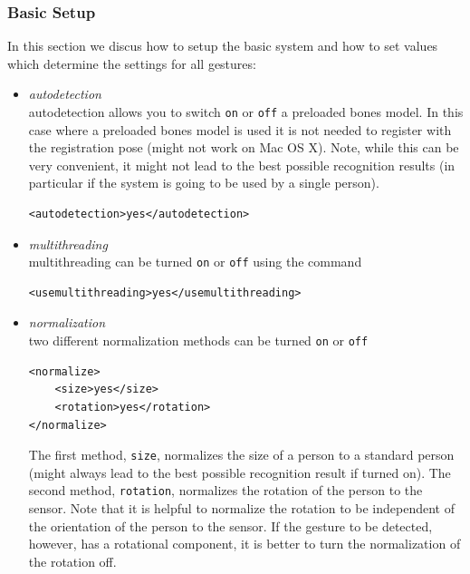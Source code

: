 \documentclass[titlepage,12pt,a4paper]{article}
\begin{document}
\subsubsection{Basic Setup}
\label{sec:basic_setup}
In this section we discus how to setup the basic system and how to set values which determine the settings for all gestures:
\begin{itemize}
\item \emph{autodetection} \\autodetection allows you to switch \texttt{on} or \texttt{off} a preloaded bones model. In this case where a preloaded bones model is used it is not needed to register with the registration pose (might not work on Mac OS X). Note, while this can be very convenient, it might not lead to the best possible recognition results (in particular if the system is going to be used by a single person).
\begin{verbatim}
<autodetection>yes</autodetection>\end{verbatim}
\item \emph{multithreading} \\ multithreading can be turned \texttt{on} or \texttt{off} using the command \begin{verbatim}
<usemultithreading>yes</usemultithreading>\end{verbatim}
\item \emph{normalization} \\ two different normalization methods can be turned \texttt{on} or \texttt{off}\begin{verbatim}
<normalize>
    <size>yes</size>
    <rotation>yes</rotation>
</normalize>\end{verbatim}
The first method, \texttt{size}, normalizes the size of a person to a standard person (might always lead to the best possible recognition result if turned on). The second method, \texttt{rotation}, normalizes the rotation of the person to the sensor. Note that it is helpful to normalize the rotation to be independent of the orientation of the person to the sensor. If the gesture to be detected, however, has a rotational component, it is better to turn the normalization of the rotation off.


\end{itemize}
\end{document}
